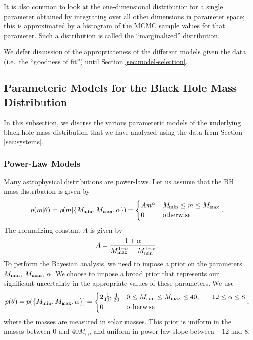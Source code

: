 \documentclass[preprint]{aastex}
\newcommand{\Msun}{M_\odot}
\newcommand{\Mmin}{M_{\textnormal{min}}}
\newcommand{\Mmax}{M_{\textnormal{max}}}
\begin{document}
It is also common to look at the one-dimensional distribution for a
single parameter obtained by integrating over all other dimensions in
parameter space; this is approximated by a histogram of the MCMC
sample values for that parameter.  Such a distribution is called the
``marginalized'' distribution.

We defer discussion of the appropriateness of the different models
given the data (i.e.\ the ``goodness of fit'') until Section
\ref{sec:model-selection}.

\subsection{Parameteric Models for the Black Hole Mass Distribution}
\label{subsec:parameteric-models}

In this subsection, we discuss the various parameteric models of the
underlying black hole mass distribution that we have analyzed using
the data from Section \ref{sec:systems}.

\subsubsection{Power-Law Models}
\label{subsubsec:power-law}

Many astrophysical distributions are power-laws.  Let us assume that
the BH mass distribution is given by
\begin{equation}
  \label{eq:power-law-dist}
  p(m|\theta) = p(m|\{\Mmin, \Mmax, \alpha \}) =
  \begin{cases}
    A m^\alpha & \Mmin \leq m \leq \Mmax \\
    0 & \textnormal{otherwise}
  \end{cases}.
\end{equation}
The normalizing constant $A$ is given by 
\begin{equation}
  A = \frac{1+\alpha}{\Mmax^{1+\alpha} - \Mmin^{1+\alpha}}.
\end{equation}
To perform the Bayesian analysis, we need to impose a prior on the
parameters $\Mmin$, $\Mmax$, $\alpha$.  We choose to impose a broad
prior that represents our significant uncertainty in the appropriate
values of these parameters.  We use
\begin{equation}
  p(\theta) = p(\{\Mmin, \Mmax, \alpha\}) = 
  \begin{cases}
    2 \frac{1}{40^2}\frac{1}{20} & 0 \leq \Mmin \leq \Mmax
    \leq 40, \quad -12 \leq \alpha \leq 8 \\
    0 & \textnormal{otherwise}
  \end{cases},
\end{equation}
where the masses are measured in solar masses.  This prior is uniform
in the masses between 0 and $40 \Msun$, and uniform in power-law slope
between $-12$ and $8$.
\end{document}
